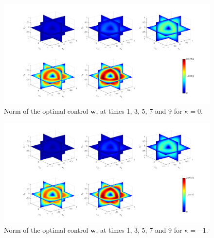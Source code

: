 \documentclass[11pt, a4paper]{article}
\theoremstyle{definition}
\newcommand{\w}{\mathbf{w}}
\begin{document}
	\begin{figure}[h]
		\centering
		\includegraphics[scale=0.35]{wNormk0.png}
		\caption{Norm of the optimal control $\w$, at times 1, 3, 5, 7 and 9 for $\kappa = 0$.} 
		\label{F4b}
	\end{figure}
	\begin{figure}[h]
		\centering
		\includegraphics[scale=0.35]{wNormkn1.png}
		\caption{Norm of the optimal control $\w$, at times 1, 3, 5, 7 and 9 for $\kappa = -1$.} 
		\label{F4c}
	\end{figure}
	
	
\end{document}
